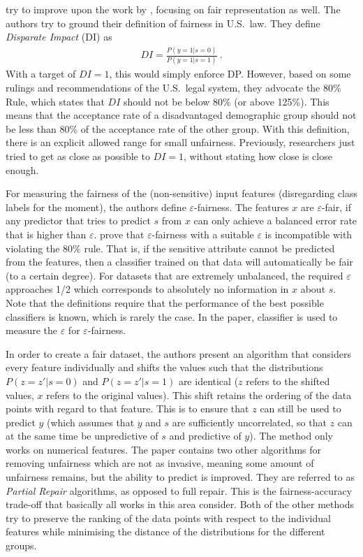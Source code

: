\citet{feldman2015certifying} try to improve upon the work by \citet{zemel2013learning}, focusing
on fair representation as well. The authors try to ground their definition of fairness in U.S.\
law. They define \emph{Disparate Impact} (DI) as \begin{align} \label{eq:disparate-impace} DI =
  \frac{P(y=1|s=0)}{P(y=1|s=1)} ~. \end{align} With a target of \(DI = 1\), this would simply
  enforce \ac{DP}. However, based on some rulings and recommendations of the U.S.\ legal system,
  they advocate the 80\% Rule, which states that \(DI\) should not be below 80\% (or above 125\%).
  This means that the acceptance rate of a disadvantaged demographic group should not be less than
  80\% of the acceptance rate of the other group. With this definition, there is an explicit
  allowed range for small unfairness. Previously, researchers just tried to get as close as
  possible to \(DI = 1\), without stating how close is close enough.

For measuring the fairness of the (non-sensitive) input features (disregarding class labels for the
moment), the authors define \(\varepsilon\)-fairness. The features \(x\) are \(\varepsilon\)-fair,
if any predictor that tries to predict \(s\) from \(x\) can only achieve a balanced error rate that
is higher than \(\varepsilon\). \citet{feldman2015certifying} prove that \(\varepsilon\)-fairness
with a suitable \(\varepsilon\) is incompatible with violating the 80\% rule. That is, if the
sensitive attribute cannot be predicted from the features, then a classifier trained on that data
will automatically be fair (to a certain degree). For datasets that are extremely unbalanced, the
required \(\varepsilon\) approaches 1/2 which corresponds to absolutely no information in \(x\)
about \(s\). Note that the definitions require that the performance of the best possible
classifiers is known, which is rarely the case. In the paper, \iac{SVM} classifier is used to
measure the \(\varepsilon\) for \(\varepsilon\)-fairness.

In order to create a fair dataset, the authors present an algorithm that considers every feature
individually and shifts the values such that the distributions \(P(z=z'|s=0)\) and \(P(z=z'|s=1)\)
are identical (\(z\) refers to the shifted values, \(x\) refers to the original values). This shift
retains the ordering of the data points with regard to that feature. This is to ensure that \(z\)
can still be used to predict \(y\) (which assumes that \(y\) and \(s\) are sufficiently
uncorrelated, so that \(z\) can at the same time be unpredictive of \(s\) and predictive of \(y\)).
The method only works on numerical features. The paper contains two other algorithms for removing
unfairness which are not as invasive, meaning some amount of unfairness remains, but the ability to
predict is improved. They are referred to as \emph{Partial Repair} algorithms, as opposed to full
repair. This is the fairness-accuracy trade-off that basically all works in this area consider.
Both of the other methods try to preserve the ranking of the data points with respect to the
individual features while minimising the distance of the distributions for the different groups.

